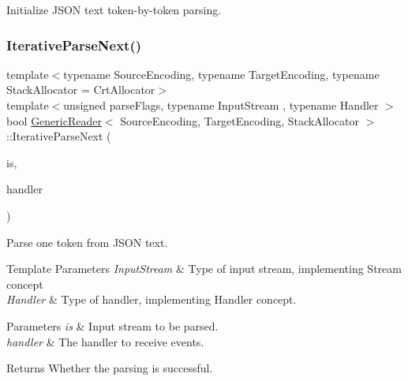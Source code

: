 Initialize J\+S\+ON text token-\/by-\/token parsing. 

\mbox{\label{classGenericReader_a257891331e0c259903e7066fb4cebf92}} 
\subsubsection{\texorpdfstring{Iterative\+Parse\+Next()}{IterativeParseNext()}}
{\footnotesize\ttfamily template$<$typename Source\+Encoding, typename Target\+Encoding, typename Stack\+Allocator = Crt\+Allocator$>$ \\
template$<$unsigned parse\+Flags, typename Input\+Stream , typename Handler $>$ \\
bool \hyperlink{classGenericReader}{Generic\+Reader}$<$ Source\+Encoding, Target\+Encoding, Stack\+Allocator $>$\+::Iterative\+Parse\+Next (\begin{DoxyParamCaption}\item[{Input\+Stream \&}]{is,  }\item[{Handler \&}]{handler }\end{DoxyParamCaption})\hspace{0.3cm}{\ttfamily [inline]}}



Parse one token from J\+S\+ON text. 


\begin{DoxyTemplParams}{Template Parameters}
{\em Input\+Stream} & Type of input stream, implementing Stream concept \\
\hline
{\em Handler} & Type of handler, implementing Handler concept. \\
\hline
\end{DoxyTemplParams}

\begin{DoxyParams}{Parameters}
{\em is} & Input stream to be parsed. \\
\hline
{\em handler} & The handler to receive events. \\
\hline
\end{DoxyParams}
\begin{DoxyReturn}{Returns}
Whether the parsing is successful. 
\end{DoxyReturn}
\mbox{\label{classGenericReader_ab07a979626cfa121365bb09b61558c11}} 
